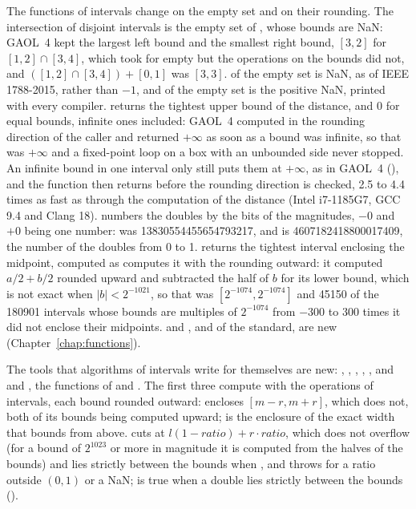 \medskip
The functions of intervals change on the empty set and on their
rounding.\newinvfive{} The intersection of disjoint intervals is the empty
set of , whose bounds are NaN: GAOL~4 kept the
largest left bound and the smallest right bound, $[3, 2]$ for
$[1, 2] \cap [3, 4]$, which  took for empty but the
operations on the bounds did not, and $([1, 2] \cap [3, 4]) + [0, 1]$ was
$[3, 3]$.  of the empty set is NaN, as  of IEEE
1788-2015, rather than $-1$, and  of the empty set is the
positive NaN, printed  with every compiler. 
returns the tightest upper bound of the distance, and 0 for equal bounds,
infinite ones included: GAOL~4 computed  in the rounding
direction of the caller and returned $+\infty$ as soon as a bound was
infinite, so that  was $+\infty$ and a
fixed-point loop on a box with an unbounded side never stopped. An infinite
bound in one interval only still puts them at $+\infty$, as in GAOL~4
(), and the function then returns before the
rounding direction is checked, 2.5 to 4.4 times as fast as
through the computation of the distance (Intel i7-1185G7, GCC 9.4 and Clang
18).  numbers the doubles by the bits of the
magnitudes, $-0$ and $+0$ being one number: 
was 13830554455654793217, and is 4607182418800017409, the number of the
doubles from 0 to 1.  returns the tightest interval enclosing the
midpoint, computed as  computes it with the rounding
outward: it computed $a/2 + b/2$ rounded upward and subtracted the half of
$b$ for its lower bound, which is not exact when $|b| < 2^{-1021}$, so that
 was $[2^{-1074}, 2^{-1074}]$ and 45150 of the
180901 intervals whose bounds are multiples of $2^{-1074}$ from $-300$ to
$300$ times it did not enclose their midpoints.  and
,  and  of the standard, are new
(Chapter~\ref{chap:functions}).

\medskip
The tools that algorithms of intervals write for themselves are
new:\newinvfive{} , ,\hfill\break
{}, , ,
and  and , the functions of
 and . The first three compute with the operations
of intervals, each bound rounded outward: 
encloses $[m - r, m + r]$, which  does not, both
of its bounds being computed upward;  is the
enclosure of the exact width that  bounds from above.
 cuts at $l(1 - \mathit{ratio}) + r \cdot \mathit{ratio}$,
which does not overflow (for a bound of $2^{1023}$ or more in magnitude it is
computed from the halves of the bounds) and lies strictly between the bounds when
, and throws  for a ratio
outside $(0, 1)$ or a NaN;  is true when a double
lies strictly between the bounds ().

